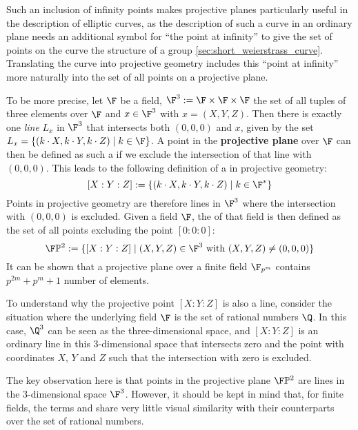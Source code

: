 Such an inclusion of infinity points makes projective planes particularly useful in the description of elliptic curves, as the description of such a curve in an ordinary plane needs an additional symbol for ``the point at infinity'' to give the set of points on the curve the structure of a group \ref{sec:short_weierstrass_curve}. Translating the curve into projective geometry includes this ``point at infinity'' more naturally into the set of all points on a projective plane.

To be more precise, let $\F$ be a field, $\F^3:=\F\times \F\times \F$ the set of all tuples of three elements over $\F$ and $x\in \F^3$ with $x=(X,Y,Z)$. Then there is exactly one \textit{line} $L_x$ in $\F^3$ that intersects both $(0,0,0)$ and $x$, given by the set $L_x=\{(k\cdot X,k\cdot Y, k\cdot Z)\;|\; k\in\F\}$. A point in the \textbf{projective plane} over $\F$ can then be defined as such a  if we exclude the intersection of that line with  $(0,0,0)$. This leads to the following definition of a  in projective geometry:
\begin{equation}
\label{def:projective_coordinate}
[X:Y:Z] := \{(k\cdot X,k\cdot Y, k\cdot Z)\;|\; k\in\F^*\}
\end{equation}
Points in projective geometry are therefore lines in $\F^3$ where the intersection with $(0,0,0)$ is excluded. Given a field $\F$, the  of that field is then defined as the set of all  points excluding the point $[0:0:0]$:
\begin{equation}
\F\mathbb{P}^2:=\{[X:Y:Z]\;|\; (X,Y,Z)\in \F^3\text{ with } (X,Y,Z)\neq (0,0,0)\}
\end{equation}
It can be shown that a projective plane over a finite field $\F_{p^m}$ contains $p^{2m}+p^m+1$ number of elements.

To understand why the projective point $[X:Y:Z]$ is also a line, consider the situation where the underlying field $\F$ is the set of rational numbers $\Q$. In this case, $\Q^3$ can be seen as the three-dimensional space, and $[X:Y:Z]$ is an ordinary line in this 3-dimensional space that intersects zero and the point with coordinates $X$, $Y$ and $Z$ such that the intersection with zero is excluded.

The key observation here is that points in the projective plane $\F\mathbb{P}^2$ are lines in the $3$-dimensional space $\F^3$. However, it should be kept in mind that, for finite fields, the terms  and  share very little visual similarity with their counterparts over the set of rational numbers.

